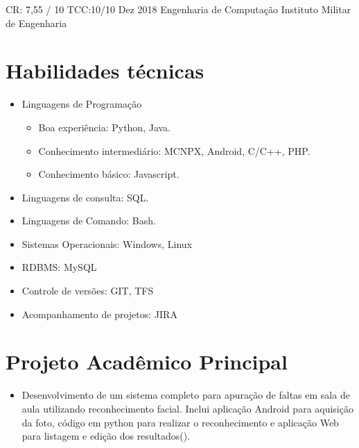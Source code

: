 \documentclass{tccv}
\begin{document}
\begin{yearlist}

    \item[CR: 7,55 / 10 \newline TCC:10/10 ]{Dez 2018}
        {Engenharia de Computação}
        {Instituto Militar de Engenharia}

\end{yearlist}

\section{Habilidades técnicas}
    
    \begin{itemize}  
        \item Linguagens de Programação
            \begin{itemize}
                \item Boa experiência: Python, Java.
                \item Conhecimento intermediário: MCNPX, Android, C/C++, PHP.
                \item Conhecimento básico: Javascript.
            \end{itemize}
        \item Linguagens de consulta: SQL.
        \item Linguagens de Comando: Bash.
        \item Sistemas Operacionais: Windows, Linux
        \item RDBMS: MySQL 
        \item Controle de versões: GIT, TFS
        \item Acompanhamento de projetos: JIRA
    \end{itemize}

\section{Projeto Acadêmico Principal}
    
    \begin{itemize}
        \item Desenvolvimento de um sistema completo para apuração de faltas em sala de aula utilizando reconhecimento facial. Inclui aplicação Android para aquisição da foto, código em python para realizar o reconhecimento e aplicação Web para listagem e edição dos resultados(\href{https://github.com/gdelfs/Tchau-Papeleta-de-Faltas}{\faCode}).
     \begin{comment}
        \item Desenvolvimento de um chat entre mobile e computador utilizando comunicação TCP entre as respectivas aplicações Android e Java (\href{https://github.com/gdelfs/Messenger-Android-Computador}{\faCode}).
     \end{comment}
    \end{itemize}
\end{document}
